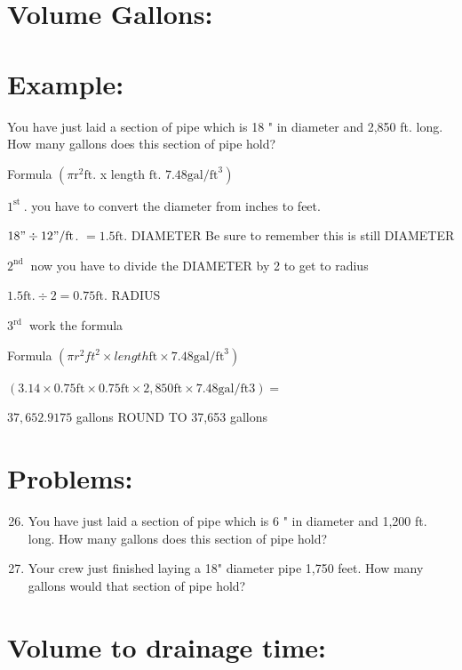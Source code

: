 \documentclass[10pt]{article}
\begin{document}
\section{Volume Gallons:}
\section{Example:}
You have just laid a section of pipe which is 18 " in diameter and 2,850 ft. long. How many gallons does this section of pipe hold?

Formula $\left(\pi \mathrm{r}^{2} \mathrm{ft}\right.$. x length $\mathrm{ft}$. $\left.7.48 \mathrm{gal} / \mathrm{ft}^{3}\right)$

$1^{\text {st }}$. you have to convert the diameter from inches to feet.

$18 " \div 12 " / \mathrm{ft}$. $=1.5 \mathrm{ft}$. DIAMETER Be sure to remember this is still DIAMETER

$2^{\text {nd }}$ now you have to divide the DIAMETER by 2 to get to radius

$1.5 \mathrm{ft} . \div 2=0.75 \mathrm{ft}$. RADIUS

$3^{\text {rd }}$ work the formula

Formula $\left(\pi r^{2} ft^2 \right.\times length \mathrm{ft}\times \left.7.48 \mathrm{gal} / \mathrm{ft}^{3}\right)$

$(3.14 \times 0.75 \mathrm{ft} \times 0.75 \mathrm{ft}\times 2,850 \mathrm{ft} \times 7.48 \mathrm{gal} / \mathrm{ft} 3)=$

$37,652.9175$ gallons ROUND TO 37,653 gallons

\section{Problems:}
\begin{enumerate}
  \setcounter{enumi}{25}
  \item You have just laid a section of pipe which is 6 " in diameter and 1,200 ft. long. How many gallons does this section of pipe hold?

  \item Your crew just finished laying a 18" diameter pipe 1,750 feet. How many gallons would that section of pipe hold?

\end{enumerate}
\section{Volume to drainage time:}
\end{document}
